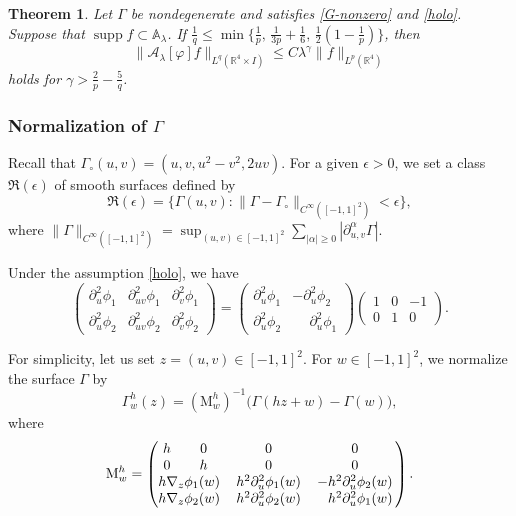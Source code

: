 \documentclass[10pt] %
{amsart}
\theoremstyle{plain}
\newtheorem{thm}{Theorem}[section]
\numberwithin{equation}{section}
\DeclareMathOperator{\supp}{supp}
\begin{document}
\begin{thm}\label{thm-LS}
Let $\Gamma$ be nondegenerate and satisfies \eqref{G-nonzero} and \eqref{holo}.
Suppose that $\supp \widehat f \subset  {\mathbb A}_\lambda $. 
If $\frac 1 q \le \min\{ \frac 1p,\, \frac 1{3p}+\frac16,\, \frac 12(1-\frac1p) 
\}$, then
\begin{equation}\label{est-LS2}
\|\mathcal A_\lambda[\varphi] f \| _{L^q(\mathbb R^4\times I)} \le C\lambda^{\gamma} \|f \|_{L^p(\mathbb R^4)}
\end{equation}
holds for $\gamma > \frac 2p -\frac 5 q$. 
\end{thm}

 
\subsubsection*{Normalization of $\Gamma$}

Recall that $\Gamma_\circ(u,v) = (u,v,u^2-v^2,2uv)$. 
For a given $\epsilon > 0$, we set a class $\mathfrak R (\epsilon )$ of smooth surfaces defined by   
\[  
\mathfrak R (\epsilon ) = \Big\{ \Gamma(u,v)  : \big\| \Gamma   - \Gamma_\circ \big\|_{C^\infty([-1,1]^2)} < \epsilon    \Big\},
\]
where  $\| \Gamma\|_{C^\infty([-1,1]^2)} =   \sup_{(u,v)\in[-1,1]^2}  \sum_{|\alpha|  \ge 0 }|\partial^\alpha_{u,v}  \Gamma |$.

Under the assumption \eqref{holo},
we have
\begin{equation}\label{r2}
\begin{pmatrix} \partial_{u}^2 \phi_1 &\partial_{uv}^2 \phi_1 & \partial_{v}^2 \phi_1 \\ \partial_{u}^2 \phi_2 & \partial_{uv}^2 \phi_2 & \partial_{v}^2 \phi_2 \end{pmatrix} =   \begin{pmatrix} \partial_u^2\phi_1 & -\partial_u^2\phi_2    \\  \partial_u^2\phi_2 & \phantom{-}\partial_u^2\phi_1    \end{pmatrix} \begin{pmatrix} 1 & 0  & -1 \\ 0 & 1 & 0  \end{pmatrix}  . 
\end{equation}


For simplicity, let us set $z=(u,v)\in [-1,1]^2$.  
For $w   \in [-1,1]^2$, 
we normalize the surface $\Gamma$  by
\begin{equation}\label{normal-gamma}
\Gamma_{  w}^h(z) = (\mathrm M^h_w)^{-1} \big(\Gamma(hz+ w)  - \Gamma( w)   \big) ,
\end{equation}
where \[
\mathrm M^h_w  = 
\begin{pmatrix} 
\,\,  h & \, 0  & \,0 &  \,0 \,  \\
\,\,  0 & \, h & \, 0 &  \,0 \,\\
\multicolumn{2}{l}{h\nabla_{z}\phi_1(w)} & \,h^2 \partial_u^2\phi_1(w)  & \,-h^2\partial_u^2\phi_2(w)\, \\
\multicolumn{2}{l}{h \nabla_{z}\phi_2(w)} &\,h^2\partial_u^2\phi_2(w) & \,\phantom{-}h^2 \partial_u^2\phi_1(w) \,
\end{pmatrix} .
\]
\end{document}
